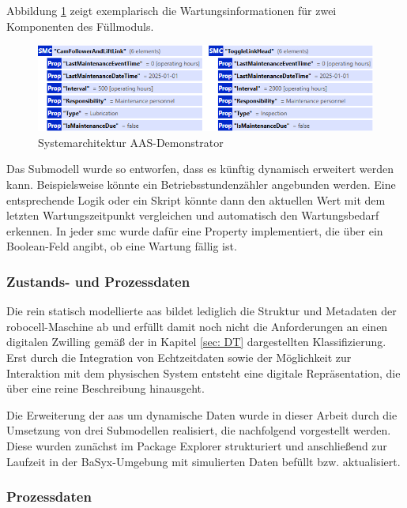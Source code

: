 Abbildung \ref{fig:Wartung} zeigt exemplarisch die Wartungsinformationen für zwei Komponenten des Füllmoduls.

\begin{figure}[htbp]
    \centering
        \includegraphics[width=1\textwidth]{Bilder/Ergebnisse/StatischeDaten/Wartung.png}
    \caption{Systemarchitektur AAS-Demonstrator}
    \label{fig:Wartung}
\end{figure}

Das Submodell wurde so entworfen, dass es künftig dynamisch erweitert werden kann. 
Beispielsweise könnte ein Betriebsstundenzähler angebunden werden. 
Eine entsprechende Logik oder ein Skript könnte dann den aktuellen Wert mit dem letzten Wartungszeitpunkt vergleichen und automatisch den Wartungsbedarf erkennen. 
In jeder \acs{smc} wurde dafür eine Property implementiert, die über ein Boolean-Feld angibt, ob eine Wartung fällig ist.

\subsubsection{Zustands- und Prozessdaten}
Die rein statisch modellierte \acs{aas} bildet lediglich die Struktur und Metadaten der robocell-Maschine ab und erfüllt damit noch nicht die Anforderungen an einen digitalen Zwilling gemäß der in Kapitel \ref{sec: DT} dargestellten Klassifizierung. 
Erst durch die Integration von Echtzeitdaten sowie der Möglichkeit zur Interaktion mit dem physischen System entsteht eine digitale Repräsentation, die über eine reine Beschreibung hinausgeht.

Die Erweiterung der \acs{aas} um dynamische Daten wurde in dieser Arbeit durch die Umsetzung von drei Submodellen realisiert, die nachfolgend vorgestellt werden. 
Diese wurden zunächst im Package Explorer strukturiert und anschließend zur Laufzeit in der BaSyx-Umgebung mit simulierten Daten befüllt bzw. aktualisiert.

\subsubsection*{Prozessdaten}
\vspace{-0.5em}

